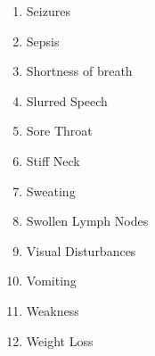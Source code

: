 \documentclass{article}
\begin{document}
\begin{multicols}{2}
\begin{enumerate}
    \item Seizures
    \item Sepsis
    \item Shortness of breath
    \item Slurred Speech
    \item Sore Throat
    \item Stiff Neck
    \item Sweating
    \item Swollen Lymph Nodes
    \item Visual Disturbances
    \item Vomiting
    \item Weakness
    \item Weight Loss
  \end{enumerate}
\end{multicols}
\end{document}
